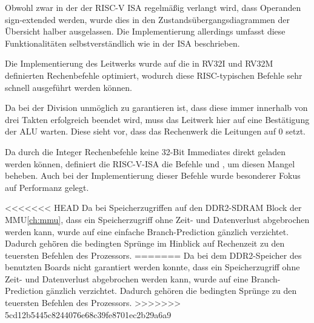 Obwohl zwar in der der RISC-V ISA regelm\"a\ss{}ig verlangt wird, dass Operanden sign-extended werden, wurde dies in den Zustands\-\"uber\-gangs\-dia\-grammen der \"Ubersicht halber
ausgelassen. Die Implementierung allerdings umfasst diese Funktionalit\"aten selbstverst\"andlich wie in der ISA
beschrieben.

Die Implementierung des Leitwerks wurde auf die in RV32I und RV32M definierten Rechenbefehle
optimiert, wodurch diese RISC-typischen Befehle sehr schnell
ausgef\"uhrt werden k\"onnen.


Da bei der Division unm\"oglich zu garantieren ist, dass diese immer innerhalb von drei
Takten erfolgreich beendet wird, muss das Leitwerk hier auf eine Best\"atigung der ALU
warten. Diese sieht vor, dass das Rechenwerk die Leitungen 
auf 0 setzt.


Da durch die Integer Rechenbefehle keine 32-Bit Immediates direkt geladen werden
k\"onnen, definiert die RISC-V-ISA die Befehle  und , um
diesen Mangel beheben. Auch bei der Implementierung dieser Befehle wurde besonderer Fokus auf Performanz gelegt.



<<<<<<< HEAD
Da bei Speicherzugriffen auf den DDR2-SDRAM Block der MMU\ref{ch:mmu}, dass ein Speicherzugriff ohne Zeit- und Datenverlust abgebrochen
werden kann, wurde auf eine einfache Branch-Prediction g\"anzlich verzichtet.
Dadurch geh\"ören die bedingten Spr\"unge im Hinblick auf Rechenzeit zu den teuersten Befehlen des
Prozessors.
=======
Da bei dem DDR2-Speicher des benutzten Boards nicht garantiert werden
konnte, dass ein Speicherzugriff ohne Zeit- und Datenverlust abgebrochen werden
kann, wurde auf eine Branch-Prediction g\"anzlich verzichtet. Dadurch geh\"oren
die bedingten Spr\"unge zu den teuersten Befehlen des Prozessors.
>>>>>>> 5cd12b5445c8244076e68c39fe8701ec2b29a6a9

